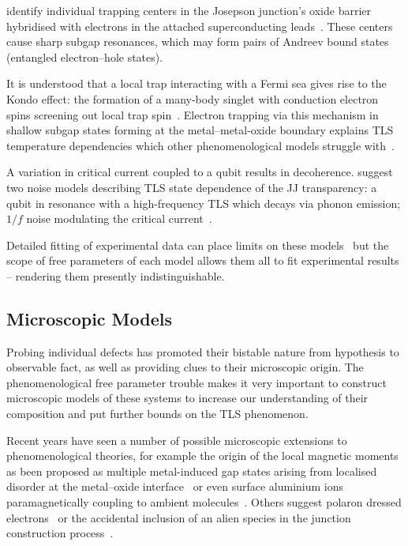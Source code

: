 \divtext

\citeauthor{DeSousa2009} identify individual trapping centers in the Josepson junction's oxide barrier hybridised with electrons in the attached superconducting leads~\cite{DeSousa2009}. 
These centers cause sharp subgap resonances, which may form pairs of Andreev bound states (entangled electron--hole states). 

\divtext

It is understood that a local trap interacting with a Fermi sea gives rise to the Kondo effect: the formation of a many-body singlet with conduction electron spins screening out local trap spin~\cite{Wilson1975}.
Electron trapping via this mechanism in shallow subgap states forming at the metal--metal-oxide boundary explains TLS temperature dependencies which other phenomenological models struggle with~\cite{Faoro2007}.

\divtext

A variation in critical current coupled to a qubit results in decoherence. 
\citeauthor{Ku2005} suggest two noise models describing TLS state dependence of the JJ transparency: a qubit in resonance with a high-frequency TLS which decays via phonon emission; $1/f$ noise modulating the critical current~\cite{Ku2005}.

\divtext

Detailed fitting of experimental data can place limits on these models~\cite{Cole2010} but the scope of free parameters of each model allows them all to fit experimental results -- rendering them presently indistinguishable.

\subsection{Microscopic Models}

Probing individual defects has promoted their bistable nature from hypothesis to observable fact, as well as providing clues to their microscopic origin.
The phenomenological free parameter trouble makes it very important to construct microscopic models of these systems to increase our understanding of their composition and put further bounds on the TLS phenomenon.

Recent years have seen a number of possible microscopic extensions to phenomenological theories, for example the origin of the local magnetic moments as been proposed as multiple metal-induced gap states arising from localised disorder at the metal--oxide interface~\cite{Choi2009} or even surface aluminium ions paramagnetically coupling to ambient molecules~\cite{Lee2014}.
Others suggest polaron dressed electrons~\cite{Agarwal2013} or the accidental inclusion of an alien species in the junction construction process~\cite{Jameson2011, Holder2013}.

